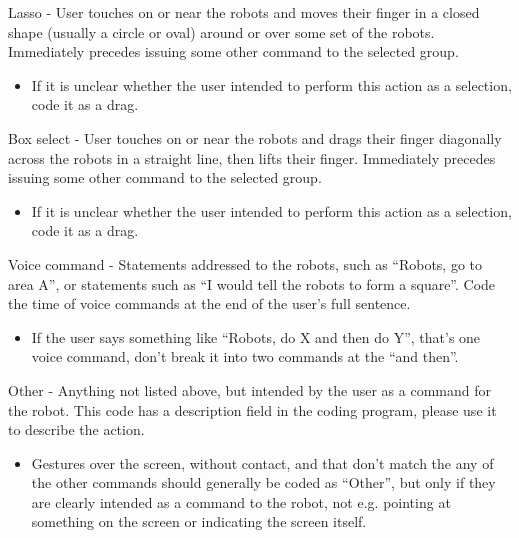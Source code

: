 Lasso - User touches on or near the robots and moves their finger in a closed shape (usually a circle or oval) around or over some set of the robots. Immediately precedes issuing some other command to the selected group. 
\begin{itemize}
	\item If it is unclear whether the user intended to perform this action as a selection, code it as a drag. 
\end{itemize}

Box select - User touches on or near the robots and drags their finger diagonally across the robots in a straight line, then lifts their finger. Immediately precedes issuing some other command to the selected group. 
\begin{itemize}
	\item If it is unclear whether the user intended to perform this action as a selection, code it as a drag.  
\end{itemize}

Voice command - Statements addressed to the robots, such as “Robots, go to area A”, or statements such as “I would tell the robots to form a square”. Code the time of voice commands at the end of the user’s full sentence. 
\begin{itemize}
	\item If the user says something like “Robots, do X and then do Y”, that’s one voice command, don’t break it into two commands at the “and then”. 
\end{itemize}

Other - Anything not listed above, but intended by the user as a command for the robot. This code has a description field in the coding program, please use it to describe the action. 
\begin{itemize}
	\item Gestures over the screen, without contact, and that don’t match the any of the other commands should generally be coded as “Other”, but only if they are clearly intended as a command to the robot, not e.g. pointing at something on the screen or indicating the screen itself. 
\end{itemize}